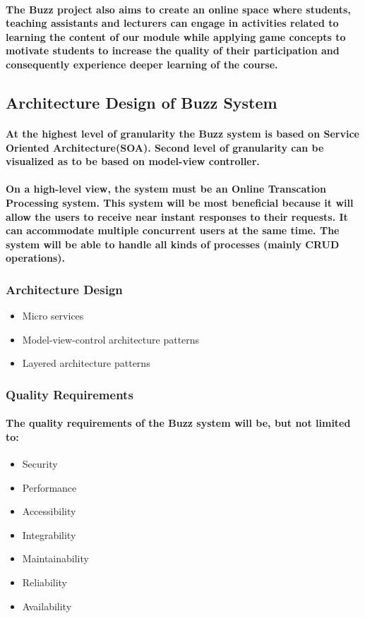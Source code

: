\documentclass[12pt]{article}
\begin{document}
\paragraph{The Buzz project also aims to create an online space where students, teaching assistants and lecturers can engage in activities related to learning the content of our module while applying game concepts to motivate students to increase the quality of their participation and consequently experience deeper learning of the course.}

\subsection{Architecture Design of Buzz System}
\paragraph{At the highest level of granularity the Buzz system is based on Service Oriented Architecture(SOA). Second level of granularity can be visualized as to be based on model-view controller.}
\paragraph{On a high-level view, the system must be an Online Transcation Processing system. This system will be most beneficial because it will allow the users to receive near instant responses to their requests. It can accommodate multiple concurrent users at the same time. The system will be able to handle all kinds of processes (mainly CRUD operations).}

\newpage
\subsubsection*{Architecture Design}
\begin{itemize}
\item Micro services
\item Model-view-control architecture patterns
\item Layered architecture patterns
\end{itemize}
\subsubsection*{Quality Requirements}
\paragraph*{The quality requirements of the Buzz system will be, but not limited to:}
\begin{itemize}
\item Security
\item Performance
\item Accessibility
\item Integrability
\item Maintainability
\item Reliability
\item Availability
\end{itemize}
\end{document}

